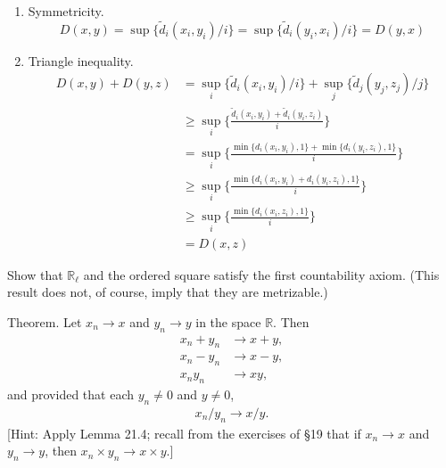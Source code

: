 \begin{solution}
\begin{enumerate}
      \item Symmetricity. 
        \begin{equation}
          D(x, y) = \sup\{\tilde{d}_i (x_i, y_i) / i \} = \sup\{\tilde{d}_i (y_i, x_i) / i \} = D(y, x)
        \end{equation}

      \item Triangle inequality. 
        \begin{align}
          D(x, y) + D(y, z) & = \sup_i \{\tilde{d}_i (x_i, y_i) / i \} + \sup_j \{\tilde{d}_j (y_j, z_j) / j \} \\
                            & \geq \sup_i \bigg\{ \frac{\tilde{d}_i (x_i, y_i) + \tilde{d}_i (y_i, z_i)}{i} \bigg\} \\
                            & = \sup_i \bigg\{ \frac{ \min\{d_i (x_i, y_i), 1\} + \min\{ d_i (y_i, z_i), 1\}}{i} \bigg\} \\
                            & \geq \sup_i \bigg\{ \frac{ \min\{d_i (x_i, y_i) + d_i (y_i, z_i), 1\}}{i} \bigg\} \\ 
                            & \geq \sup_i \bigg\{ \frac{ \min\{d_i (x_i, z_i), 1\}}{i} \bigg\} \\ 
                            & = D(x, z)
        \end{align}
    \end{enumerate}
  \end{solution}

  \begin{exercise}[Munkres 21.4]
    Show that $\mathbb{R}_\ell$ and the ordered square satisfy the first countability axiom. (This result does not, of course, imply that they are metrizable.)
  \end{exercise}

  \begin{exercise}[Munkres 21.5]
    Theorem. Let $x_n \to x$ and $y_n \to y$ in the space $\mathbb{R}$. Then
    \begin{align*}
      x_n + y_n &\to x + y, \\
      x_n - y_n &\to x - y, \\
      x_ny_n &\to xy,
    \end{align*}
    and provided that each $y_n \neq 0$ and $y \neq 0$,
    \begin{align*}
      x_n/y_n \to x/y.
    \end{align*}
    [Hint: Apply Lemma 21.4; recall from the exercises of \S19 that if $x_n \to x$ and $y_n \to y$, then $x_n \times y_n \to x \times y$.]
  \end{exercise}

